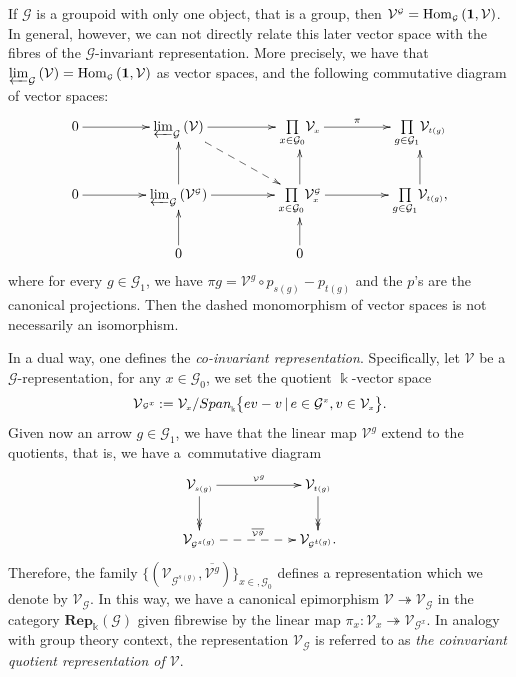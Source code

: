 \documentclass[11pt]{article}
\numberwithin{equation}{section}
\renewcommand{\hom}[3]{\mathrm{Hom}_{\Sscript{#1}}\left(#2, #3\right)}
\newcommand{\bara}[1]{\overline{#1}}
\newcommand{\Rep}[1]{\mathbf{Rep}_{\Sscript{\Bbbk}}(#1)}
\newcommand{\Go}{\cG_{\Sscript{0}}}
\newcommand{\Ga}{\cG_{\Sscript{1}}}
\newcommand{\Vx}{\cV_{\Sscript{x}}}
\newcommand{\Vg}{\cV^{\Sscript{g}}}
\newcommand{\cG}{{\mathcal G}}
\newcommand{\cV}{{\mathcal V}}
\newcommand{\Gx}{\mathcal{G}^{\Sscript{x}}}
\newcommand{\Sscript}[1]{\scriptscriptstyle{#1}}
\newcommand{\prolimit}[2]{\varprojlim_{#1}\left({#2}\right)}
\newcommand{\Vgx}{\cV^{\Sscript{\cG}}_{\Sscript{x}}}
\begin{document}
\begin{Remark}\label{rem:invaraiant} If $\cG$ is a groupoid with only one object, that is a group, then $\cV^{\Sscript{\cG}} = \hom{\cG}{\bf 1}{\cV}$. In general, however, we can not directly relate this later vector space with the fibres of the $\cG$-invariant representation. More precisely, we have that $\prolimit{\cG}{\cV} = \hom{\cG}{\bf 1}{\cV}$ as vector spaces, and the following commutative diagram of vector spaces:
\begin{gather*}
\xymatrix@C=45pt{ 0 \ar@{->}^-{}[r] & \prolimit{\cG}{\cV} \ar@{->}^-{}[r] \ar@{-->}^-{}[dr] & \underset{x \in \Go}{\prod} \Vx \ar@{->}^-{\pi}[r] & \underset{g \in \Ga}{\prod} \cV_{\Sscript{t(g)}} \\ 0 \ar@{->}^-{}[r] & \prolimit{\cG}{\cV^{\Sscript{\cG}}} \ar@{->}^-{}[r] \ar@{->}^-{}[u] & \underset{x \in \Go}{\prod} \Vgx \ar@{->}^-{}[u] \ar@{->}^-{}[r] & \underset{g \in \Ga}{\prod} \cV_{\Sscript{t(g)}}, \ar@{->}^-{}[u] \\ & 0 \ar@{->}^-{}[u] & 0 \ar@{->}^-{}[u] &}
\end{gather*}
where for every $g \in \Ga$, we have $\pi{\Sscript{g}}= \Vg \circ p_{\Sscript{s(g)}} - p_{\Sscript{t(g)}}$ and the $p$'s are the canonical projections. Then the dashed monomorphism of vector spaces is not necessarily an isomorphism.
\end{Remark}

In a dual way, one defines the \emph{co-invariant representation}. Specifically, let $\cV$ be a $\cG$-representation, for any $x \in \Go$, we set the quotient $\Bbbk$-vector space
\begin{gather*}
\cV{\Sscript{\Gx}}: = \Vx/ {\rm Span}_{\Sscript{\Bbbk}} \big\{ ev-v\,|\, e \in \Gx, v \in \Vx \big\}.
\end{gather*}
Given now an arrow $g \in\Ga$, we have that the linear map $\cV^{\Sscript{g}}$ extend to the quotients, that is, we have a~commutative diagram
\begin{gather*}
\xymatrix{ \cV_{\Sscript{s(g)}}
\ar@{->}^-{\Sscript{\cV^{\Sscript{g}}}}[rr] \ar@{->>}^-{}[d] &&
\cV_{\Sscript{t(g)}} \ar@{->>}^-{}[d] \\ \cV_{\Sscript{\cG^{s(g)}}}
\ar@{-->}^-{\Sscript{\bara{\cV^{\Sscript{g}}}}}[rr] & &
\cV_{\Sscript{\cG^{t(g)}}}. }
\end{gather*}
Therefore, the family $\{(\cV_{\Sscript{\cG^{s(g)}}}, \bara{\cV^{\Sscript{g}}} )\}_{x \in, \Go}$ defines a representation which we denote by $\cV_{\Sscript{\cG}}$. In this way, we have a canonical epimorphism $\cV \twoheadrightarrow \cV_{\Sscript{\cG}}$ in the category $\Rep{\cG}$ given fibrewise by the linear map $\pi_{\Sscript{x}}\colon \Vx \twoheadrightarrow \cV_{\Sscript{\cG^x}}$. In analogy with group theory context, the representation $\cV_{\Sscript{\cG}}$ is referred to as \emph{the coinvariant quotient representation of $\cV$}.
\end{document}
